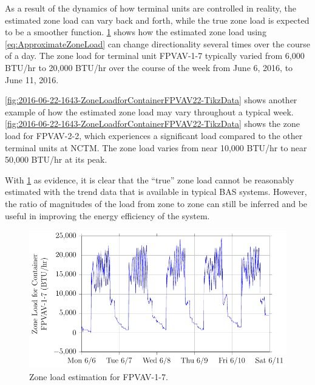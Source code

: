 As a result of the dynamics of how terminal units are controlled in
reality, the estimated zone load can vary back and forth, while the true
zone load is expected to be a smoother function. \figref{}
\ref{fig:2016-06-22-1654-ZoneLoadforContainerFPVAV17-TikzData} shows how
the estimated zone load using  \ref{eq:ApproximateZoneLoad}
can change directionality several times over the course of a day. The
zone load for terminal unit FPVAV-1-7 typically varied from 6,000 BTU/hr
to 20,000 BTU/hr over the course of the week from June 6, 2016, to June
11, 2016.

\figref{} \ref{fig:2016-06-22-1643-ZoneLoadforContainerFPVAV22-TikzData}
shows another example of how the estimated zone load may vary throughout
a typical week. \figref{}
\ref{fig:2016-06-22-1643-ZoneLoadforContainerFPVAV22-TikzData} shows the
zone load for FPVAV-2-2, which experiences a significant load compared
to the other terminal units at NCTM. The zone load varies from near
10,000 BTU/hr to near 50,000 BTU/hr at its peak.

With \figref{}
\ref{fig:2016-06-22-1654-ZoneLoadforContainerFPVAV17-TikzData} as
evidence, it is clear that the ``true'' zone load cannot be reasonably
estimated with the trend data that is available in typical BAS systems.
However, the ratio of magnitudes of the load from zone to zone can still
be inferred and be useful in improving the energy efficiency of the
system.  

\begin{figure}
\centering
\includegraphics[]{Plots/2016-06-22-1654-ZoneLoadforContainerFPVAV17-TikzData.pdf}
\caption{Zone load estimation for FPVAV-1-7.}
\label{fig:2016-06-22-1654-ZoneLoadforContainerFPVAV17-TikzData}
\end{figure}

